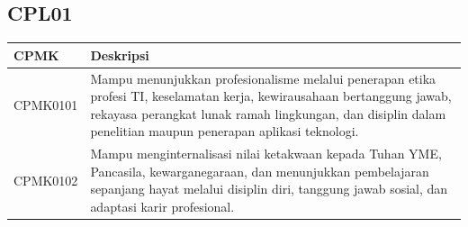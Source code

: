 \subsection{CPL01}
\begin{longtable}{L{2cm}L{12cm}}
\toprule
CPMK & Deskripsi \\
\midrule
\endhead
CPMK0101 & Mampu menunjukkan profesionalisme melalui penerapan etika profesi TI, keselamatan kerja, kewirausahaan bertanggung jawab, rekayasa perangkat lunak ramah lingkungan, dan disiplin dalam penelitian maupun penerapan aplikasi teknologi. \\
CPMK0102 & Mampu menginternalisasi nilai ketakwaan kepada Tuhan YME, Pancasila, kewarganegaraan, dan menunjukkan pembelajaran sepanjang hayat melalui disiplin diri, tanggung jawab sosial, dan adaptasi karir profesional. \\
\bottomrule
\end{longtable}


